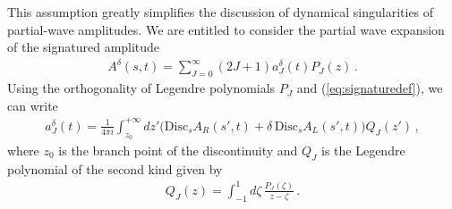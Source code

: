 This assumption greatly simplifies the discussion of dynamical singularities of partial-wave amplitudes.
We are entitled to consider the partial wave expansion of the signatured amplitude
\begin{align}
  \label{eq:partialwavesignature}
  A^{\delta}(s,t)=\sum_{J=0}^{\infty} (2J+1) a_{J}^{\delta}(t) P_{J}(z)\,.
\end{align}
Using the orthogonality of Legendre polynomials $P_J$ and (\ref{eq:signaturedef}), we can write
\begin{align}
  \label{eq:partialwavesignatureHelicity}
  a_{J}^{\delta}(t)=\frac{1}{4\pi i}\int_{z_0}^{+\infty} dz'\Big( \text{Disc}_{s}A_{R}(s',t)+\delta\,\text{Disc}_{s}A_{L}(s',t)\Big) Q_J(z')\,,
\end{align}
where $z_0$ is the branch point of the discontinuity and
$Q_J$ is the Legendre polynomial of the second kind  given by
\begin{align}
  Q_J(z) = \int_{-1}^{1} d\zeta \,\frac{P_J(\zeta)}{z-\zeta} \,.
\end{align}

